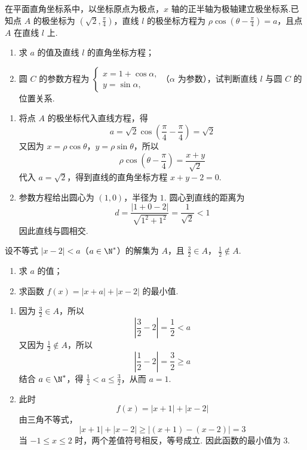 \begin{problem}
在平面直角坐标系中，以坐标原点为极点，\(x\) 轴的正半轴为极轴建立极坐标系.已知点 \(A\) 的极坐标为 \(\left(\sqrt{2}, \frac{\pi}{4}\right)\)，直线 \(l\) 的极坐标方程为 \(\rho \cos \left(\theta - \frac{\pi}{4}\right) = a\)，且点 \(A\) 在直线 \(l\) 上.

\begin{enumerate}
\item 求 \(a\) 的值及直线 \(l\) 的直角坐标方程；
\item 圆 \(C\) 的参数方程为 \(\begin{cases}
x = 1 + \cos \alpha,\\
y = \sin \alpha,
\end{cases}\)（\(\alpha\) 为参数），试判断直线 \(l\) 与圆 \(C\) 的位置关系.
\end{enumerate}
\end{problem}

\begin{solution}
\begin{enumerate}
\item 将点 \(A\) 的极坐标代入直线方程，得
\[
a=\sqrt2\cos\left(\frac\pi4-\frac\pi4\right)=\sqrt2
\]
又因为 \(x=\rho\cos\theta\)，\(y=\rho\sin\theta\)，所以
\[
\rho\cos\left(\theta-\frac\pi4\right)=\frac{x+y}{\sqrt2}
\]
代入 \(a=\sqrt2\)，得到直线的直角坐标方程 \(x+y-2=0\).
\item 参数方程给出圆心为 \((1,0)\)，半径为 \(1\). 圆心到直线的距离为
\[
d=\frac{|1+0-2|}{\sqrt{1^2+1^2}}=\frac1{\sqrt2}<1
\]
因此直线与圆相交.
\end{enumerate}
\end{solution}

\begin{problem}
设不等式 \(|x - 2| < a\)（\(a \in \N^{*}\)）的解集为 \(A\)，且 \(\frac{3}{2} \in A\)，\(\ \frac{1}{2} \notin A\).

\begin{enumerate}
\item 求 \(a\) 的值；
\item 求函数 \(f(x) = |x + a| + |x - 2|\) 的最小值.
\end{enumerate}
\end{problem}

\begin{solution}
\begin{enumerate}
\item 因为 \(\frac32\in A\)，所以
\[
\left|\frac32-2\right|=\frac12<a
\]
又因为 \(\frac12\notin A\)，所以
\[
\left|\frac12-2\right|=\frac32\geqslant a
\]
结合 \(a\in\N^*\)，得 \(\frac12<a\leqslant\frac32\)，从而 \(a=1\).
\item 此时
\[
f(x)=|x+1|+|x-2|
\]
由三角不等式，
\[
|x+1|+|x-2|\geqslant|(x+1)-(x-2)|=3
\]
当 \(-1\leqslant x\leqslant2\) 时，两个差值符号相反，等号成立. 因此函数的最小值为 \(3\).
\end{enumerate}
\end{solution}
